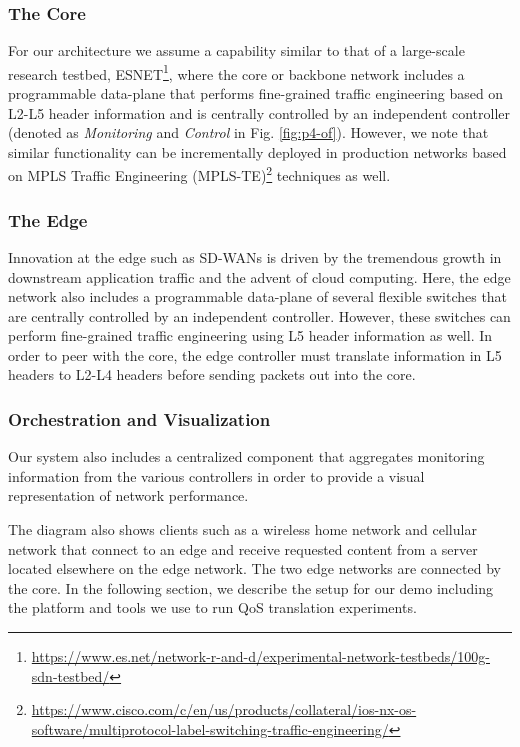 \subsubsection{The Core}
For our architecture we assume a capability similar to that of a large-scale research testbed, ESNET\footnote{\url{https://www.es.net/network-r-and-d/experimental-network-testbeds/100g-sdn-testbed/}}, where the core or backbone network includes a programmable data-plane that performs fine-grained traffic engineering based on L2-L5 header information and is centrally controlled by an independent controller (denoted as \textit{Monitoring} and \textit{Control} in Fig. \ref{fig:p4-of}). However, we note that similar functionality can be incrementally deployed in production networks based on MPLS Traffic Engineering (MPLS-TE)\footnote{\url{https://www.cisco.com/c/en/us/products/collateral/ios-nx-os-software/multiprotocol-label-switching-traffic-engineering/}} techniques as well.
\subsubsection{The Edge}
Innovation at the edge such as SD-WANs \cite{Yap:2017} is driven by the tremendous growth in downstream application traffic and the advent of cloud computing. Here, the edge network also includes a programmable data-plane of several flexible switches that are centrally controlled by an independent controller. However, these switches can perform fine-grained traffic engineering using L5 header information as well. In order to peer with the core, the edge controller must translate information in L5 headers to L2-L4 headers before sending packets out into the core.
\subsubsection{Orchestration and Visualization}
Our system also includes a centralized component that aggregates monitoring information from the various controllers in order to provide a visual representation of network performance. 

The diagram also shows clients such as a wireless home network and cellular network that connect to an edge and receive requested content from a server located elsewhere on the edge network. The two edge networks are connected by the core. In the following section, we describe the setup for our demo including the platform and tools we use to run QoS translation experiments.


